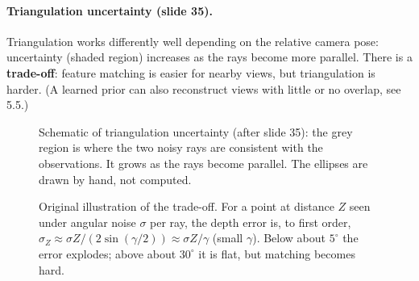 \documentclass[11pt,a4paper]{article}
\begin{document}
\paragraph{Triangulation uncertainty (slide 35).} Triangulation works differently well depending on the relative camera pose: uncertainty (shaded region) increases as the rays become more parallel. There is a \textbf{trade-off}: feature matching is easier for nearby views, but triangulation is harder. (A learned prior can also reconstruct views with little or no overlap, see 5.5.)

\begin{figure}[H]
\centering
{}
\caption{Schematic of triangulation uncertainty (after slide 35): the grey region is where the two noisy rays are consistent with the observations. It grows as the rays become parallel. The ellipses are drawn by hand, not computed.}
\end{figure}

\begin{figure}[H]
\centering
{}
\caption{Original illustration of the trade-off. For a point at distance $Z$ seen under angular noise $\sigma$ per ray, the depth error is, to first order, $\sigma_Z\approx\sigma Z/(2\sin(\gamma/2))\approx\sigma Z/\gamma$ (small $\gamma$). Below about $5^\circ$ the error explodes; above about $30^\circ$ it is flat, but matching becomes hard.}
\end{figure}
\end{document}
